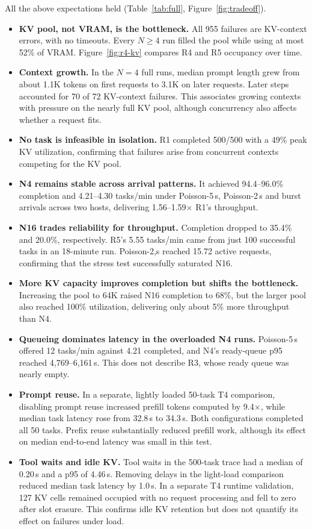 \documentclass[10pt,twocolumn,letterpaper]{article}
\begin{document}
All the above expectations held (Table~\ref{tab:full}, Figure~\ref{fig:tradeoff}).
\begin{itemize}
\item \textbf{KV pool, not VRAM, is the bottleneck.} All 955 failures are KV-context errors, with no timeouts. Every $N\ge4$ run filled the pool while using at most 52\% of VRAM. Figure~\ref{fig:r4-kv} compares R4 and R5 occupancy over time.
\item \textbf{Context growth.} In the $N=4$ full runs, median prompt length grew from about 1.1K tokens on first requests to 3.1K on later requests. Later steps accounted for 70 of 72 KV-context failures. This associates growing contexts with pressure on the nearly full KV pool, although concurrency also affects whether a request fits.
\item \textbf{No task is infeasible in isolation.} R1 completed 500/500 with a 49\% peak KV utilization, confirming that failures arise from concurrent contexts competing for the KV pool.
\item \textbf{N4 remains stable across arrival patterns.} It achieved 94.4–96.0\% completion and 4.21--4.30 tasks/min under Poisson-5\,s, Poisson-2\,s and burst arrivals across two hosts, delivering 1.56–1.59$\times$ R1's throughput.
\item \textbf{N16 trades reliability for throughput.} Completion dropped to 35.4\% and 20.0\%, respectively. R5's 5.55 tasks/min came from just 100 successful tasks in an 18-minute run. Poisson-2,s reached 15.72 active requests, confirming that the stress test successfully saturated N16.
\item \textbf{More KV capacity improves completion but shifts the bottleneck.} Increasing the pool to 64K raised N16 completion to 68\%, but the larger pool also reached 100\% utilization, delivering only about 5\% more throughput than N4.
\item \textbf{Queueing dominates latency in the overloaded N4 runs.} Poisson-5\,s offered 12 tasks/min against 4.21 completed, and N4's ready-queue p95 reached 4{,}769--6{,}161\,s. This does not describe R3, whose ready queue was nearly empty.
\item \textbf{Prompt reuse.} In a separate, lightly loaded 50-task T4 comparison, disabling prompt reuse increased prefill tokens computed by 9.4$\times$, while median task latency rose from 32.8\,s to 34.3\,s. Both configurations completed all 50 tasks. Prefix reuse substantially reduced prefill work, although its effect on median end-to-end latency was small in this test.
\item \textbf{Tool waits and idle KV.} Tool waits in the 500-task trace had a median of 0.20\,s and a p95 of 4.46\,s. Removing delays in the light-load comparison reduced median task latency by 1.0\,s. In a separate T4 runtime validation, 127 KV cells remained occupied with no request processing and fell to zero after slot erasure. This confirms idle KV retention but does not quantify its effect on failures under load.
\end{itemize}
\end{document}
